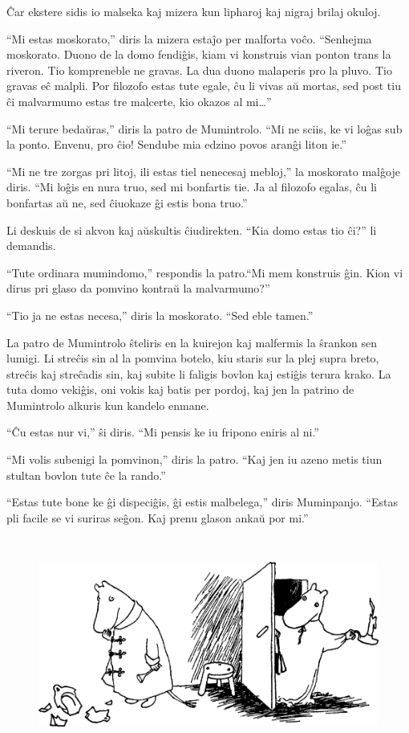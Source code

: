 Ĉar ekstere sidis io malseka kaj mizera kun lipharoj kaj nigraj brilaj okuloj.

``Mi estas moskorato,'' diris la mizera estaĵo per malforta voĉo. ``Senhejma moskorato. Duono de la domo fendiĝis, kiam vi konstruis vian ponton trans la riveron. Tio kompreneble ne gravas. La dua duono malaperis pro la pluvo. Tio gravas eĉ malpli. Por filozofo estas tute egale, ĉu li vivas aŭ mortas, sed post tiu ĉi malvarmumo estas tre malcerte, kio okazos al mi{\ldots}''

``Mi terure bedaŭras,'' diris la patro de Mumintrolo. ``Mi ne sciis, ke vi loĝas sub la ponto. Envenu, pro ĉio! Sendube mia edzino povos aranĝi liton ie.''

``Mi ne tre zorgas pri litoj, ili estas tiel nenecesaj mebloj,'' la moskorato malĝoje diris. ``Mi loĝis en nura truo, sed mi bonfartis tie. Ja al filozofo egalas, ĉu li bonfartas aŭ ne, sed ĉiuokaze ĝi estis bona truo.''

Li deskuis de si akvon kaj aŭskultis ĉiudirekten. ``Kia domo estas tio ĉi?'' li demandis.

``Tute ordinara mumindomo,'' respondis la patro.``Mi mem konstruis ĝin. Kion vi dirus pri glaso da pomvino kontraŭ la malvarmumo?''

``Tio ja ne estas necesa,'' diris la moskorato. ``Sed eble tamen.''

La patro de Mumintrolo ŝteliris en la kuirejon kaj malfermis la ŝrankon sen lumigi. Li streĉis sin al la pomvina botelo, kiu staris sur la plej supra breto, streĉis kaj streĉadis sin, kaj subite li faligis bovlon kaj estiĝis terura krako. La tuta domo vekiĝis, oni vokis kaj batis per pordoj, kaj jen la patrino de Mumintrolo alkuris kun kandelo enmane.

``Ĉu estas nur vi,'' ŝi diris. ``Mi pensis ke iu fripono eniris al ni.''

``Mi volis subenigi la pomvinon,'' diris la patro. ``Kaj jen iu azeno metis tiun stultan bovlon tute ĉe la rando.''

``Estas tute bone ke ĝi dispeciĝis, ĝi estis malbelega,'' diris Muminpanjo. ``Estas pli facile se vi suriras seĝon. Kaj prenu glason ankaŭ por mi.''

\begin{figure}[htbp]
\centering
\includegraphics[width=414pt,height=200pt]{1-11.png}
\caption{}
\label{1-11}
\end{figure}

